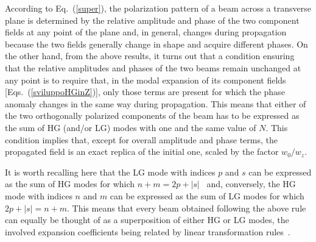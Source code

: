 \documentclass{article}
\begin{document}
According to Eq.~(\ref{super}), the polarization pattern of a beam across a transverse plane is determined by the relative amplitude and phase of the two component fields at any point of the plane and, in general, changes during propagation because the two fields generally change in shape and acquire different phases. 
On the other hand, from the above results, it turns out that a condition ensuring that the relative amplitudes and phases of the two beams remain unchanged at any point is to require that, in the modal expansion of its component fields [Eqs.~(\ref{sviluppoHGinZ})], only those terms are present for which the phase anomaly changes in the same way during propagation. This means that either of the two orthogonally polarized components of the beam has to be expressed as the sum of HG (and/or LG) modes with one and the same value of $N$. This condition implies that, except for overall amplitude and phase terms, the propagated field is an exact replica of the initial one, scaled by the factor $w_0/w_z$. 

It is worth recalling here that the LG mode with indices $p$ and $s$ can be expressed as the sum of HG modes for which $n+m=2p+|s|$~\cite{Allen:PRA92,ABRAMOCHKIN:OC91}  
and, conversely, the HG mode with indices $n$ and $m$ can be expressed as the sum of LG modes for which $2p+|s|=n+m$. This means that every beam obtained following the above rule can equally be thought of as a superposition of either HG or LG modes, the involved expansion coefficients being related by linear transformation rules~\cite{O'Neil:OC00}. 
\end{document}
